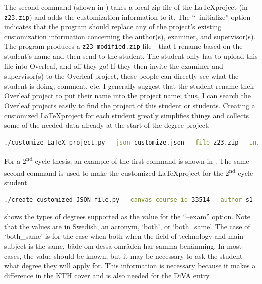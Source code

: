 The second command (shown in ) takes a local zip file of the \LaTeX\;project (in \texttt{z23.zip}) and adds the customization information to it. The ``--initialize'' option indicates that the program should replace any of the project's existing customization information concerning the author(s), examiner, and supervisor(s). The program produces a \texttt{z23-modified.zip} file - that I rename based on the student's name and then send to the student. The student only has to upload this file into Overleaf, and off they go! If they then invite the examiner and supervisor(s) to the Overleaf project, these people can directly see what the student is doing, comment, etc. I generally suggest that the student rename their Overleaf project to put their name into the project name; thus, I can search the Overleaf projects easily to find the project of this student or students. Creating a customized \LaTeX\;project for each student greatly simplifies things and collects some of the needed data already at the start of the degree project.

\begin{lstlisting}[language={bash}, caption={Create a customized \LaTeX\;project}, label=lst:customizeLaTeXproject]
./customize_LaTeX_project.py --json customize.json --file z23.zip --initialize
\end{lstlisting}

For a 2\textsuperscript{nd} cycle thesis, an example of the first command is shown in . The same second command is used to make the customized \LaTeX\;project for the 2\textsuperscript{nd} cycle student.
\begin{lstlisting}[language={bash}, caption={Create a customized \LaTeX\;project for a Master's student}, label=lst:createCustomizeJSONmasters]
./create_customized_JSON_file.py --canvas_course_id 33514 --author s1 --language eng --programCode TCSCM  --Examiner maguire --Supervisor vastberg   --Supervisor2 xxx  --courseCode DA231X  --exam master
\end{lstlisting}

 shows the types of degrees supported as the value for the ``--exam'' option. Note that the values are in Swedish, an acronym, `both', or `both\_same'. The case of `both\_same' is for the case when both when the field of technology and main subject is the same, \ie \foreignlanguage{swedish}{både om dessa områden har samma benämning}. In most cases, the value should be known, but it may be necessary to ask the student what degree they will apply for. This information is necessary because it makes a difference in the KTH cover and is also needed for the DiVA entry.

